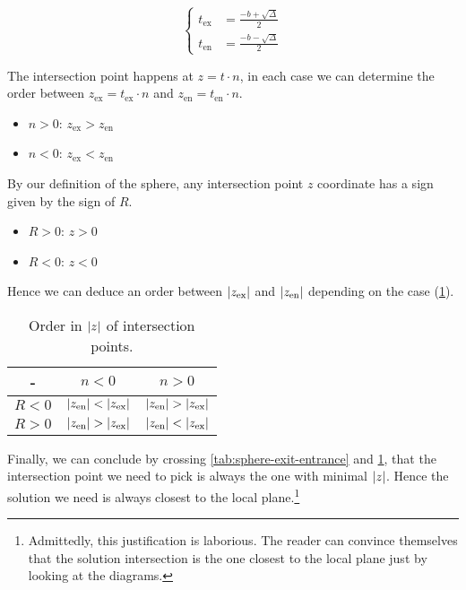 \begin{equation}
\begin{cases}
t_\textrm{ex} &= \frac{-b + \sqrt{\Delta}}{2} \\
t_\textrm{en} &= \frac{-b - \sqrt{\Delta}}{2}
\end{cases}
\end{equation}

The intersection point happens at $z = t \cdot n$, in each case we can
determine the order between $z_\textrm{ex} = t_\textrm{ex} \cdot n$ and
$z_\textrm{en} = t_\textrm{en} \cdot n$.

\begin{itemize}
\item $n>0$: $z_\textrm{ex} > z_\textrm{en}$
\item $n<0$: $z_\textrm{ex} < z_\textrm{en}$
\end{itemize}

By our definition of the sphere, any intersection point $z$ coordinate
has a sign given by the sign of $R$.

\begin{itemize}
\item $R>0$: $z>0$
\item $R<0$: $z<0$
\end{itemize}

Hence we can deduce an order between $\abs{z_\textrm{ex}}$ and
$\abs{z_\textrm{en}}$ depending on the case
(\cref{tab:sphere-intersection-zorder}).

\begin{table} \caption{\label{tab:sphere-intersection-zorder} 
Order in $\abs{z}$ of intersection points.}
\begin{tabular}{| c | c | c |} \hline
-       & $n < 0$   & $n > 0$  \\ \hline
$R < 0$ & $\abs{z_\textrm{en}} < \abs{z_\textrm{ex}}$ &
          $\abs{z_\textrm{en}} > \abs{z_\textrm{ex}}$     \\ \hline
$R > 0$ & $\abs{z_\textrm{en}} > \abs{z_\textrm{ex}}$ &
          $\abs{z_\textrm{en}} < \abs{z_\textrm{ex}}$ \\
\hline \end{tabular} \end{table}

Finally, we can conclude by crossing \cref{tab:sphere-exit-entrance}
and \cref{tab:sphere-intersection-zorder}, that the intersection point
we need to pick is always the one with minimal $\abs{z}$. Hence the
solution we need is always closest to the local plane.\footnote{Admittedly,
this justification is laborious. The reader can convince themselves
that the solution intersection is the one closest to the local plane just
by looking at the diagrams.}

